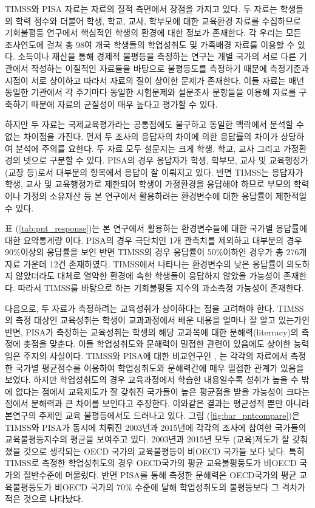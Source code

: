 TIMSS와 PISA 자료는 자료의 질적 측면에서 장점을 가지고 있다.
두 자료는 학생들의 학력 점수와 더불어  학생, 학교, 교사, 학부모에 대한 교육환경 자료를 수집하므로 기회불평등 연구에서 핵심적인 학생의 환경에 대한 정보가 존재한다.
각 우리는 모든 조사연도에 걸쳐 총 98여 개국 학생들의 학업성취도 및 가족배경 자료를 이용할 수 있다.
소득이나 재산을 통해 경제적 불평등을 측정하는 연구는 개별 국가의 서로 다른 기관에서 작성하는 이질적인 자료들을 바탕으로 불평등도를 측정하기 때문에 측정기준과 시점이 서로 상이하고 따라서 자료의 질이 상이한 문제가 존재한다.
이들 자료는 매년 동일한 기관에서 각 주기마다 동일한 시험문제와 설문조사 문항들을 이용해 자료를 구축하기 때문에 자료의 균질성이 매우 높다고 평가할 수 있다.

하지만 두 자료는 국제교육평가라는 공통점에도 불구하고 동일한 맥락에서 분석할 수 없는 차이점을 가진다.
먼저 두 조사의 응답자의 차이에 의한 응답률의 차이가 상당하여 분석에 주의를 요한다. 두 자료 모두 설문지는 크게 학생, 학교, 교사 그리고 가정환경의 넷으로 구분할 수 있다. PISA의 경우 응답자가 학생, 학부모, 교사 및 교육행정가(교장 등)로서 대부분의 항목에서 응답이 잘 이뤄지고 있다. 반면 TIMSS는 응답자가 학생, 교사 및 교육행정가로 제한되어 학생이 가정환경을 응답해야 하므로 부모의 학력이나 가정의 소유재산 등 본 연구에서 활용하려는 환경변수에 대한 응답률이 제한적일 수 있다.



표 (\ref{tab:pnt_response})는 본 연구에서 활용하는 환경변수들에 대한 국가별 응답률에 대한 요약통계량 이다. PISA의 경우 극단치인 1개 관측치를 제외하고 대부분의 경우 90\%이상의 응답률을 보인 반면 TIMSS의 경우 응답률이 50\%이하인 경우가 총 276개 자료 가운데 12건 존재하였다. 
TIMSS에서 나타나는 환경변수의 낮은 응답률이 의도하지 않았더라도 대체로 열악한 환경에 속한 학생들이 응답하지 않았을 가능성이 존재한다.
따라서 TIMSS를 바탕으로 하는 기회불평등 지수의 과소측정 가능성이 존재한다.

다음으로, 두 자료가 측정하려는 교육성취가 상이하다는 점을 고려해야 한다.
TIMSS의 측정 대상인 교육성취는 학생이 교과과정에서 배운 내용을 얼마나 잘 알고 있는가인 반면, PISA가 측정하는 교육성취는 학생의 해당 교과목에 대한 문해력(literracy)의 측정에 촛점을 맞춘다.
이들 학업성취도와 문해력이 밀접한 관련이 있음에도 상이한 능력임은 주지의 사실이다.
TIMSS와 PISA에 대한 비교연구인 \citet{wu09}, \citet{Klieme16}는 각각의 자료에서 측정한 국가별 평균점수를 이용하여 학업성취도와 문해력간에 매우 밀접한 관계가 있음을 보였다.
하지만 학업성취도의 경우 교육과정에서 학습한 내용일수록 성취가 높을 수 밖에 없다는 점에서 교육제도가 잘 갖춰진 국가들이 높은 평균점을 받을 가능성이 크다는 점에서 문해력과 큰 차이를 보인다고 주장한다. 
이와같은 결과는 평균성적 뿐만 아니라 본연구의 주제인 교육 불평등에서도 드러나고 있다.
그림 (\ref{fig:bar_pntcompare})은 TIMSS와 PISA가 동시에 치뤄진 2003년과 2015년에 각각의 조사에 참여한 국가들의 교육불평등지수의 평균을 보여주고 있다.
2003년과 2015년 모두 (교육)제도가 잘 갖춰졌을 것으로 생각되는 OECD 국가의 교육불평등이 비OECD 국가들 보다 낮다.
특히 TIMSS로 측정한 학업성취도의 경우 OECD국가의 평균 교육불평등도가 비OECD 국가의 절반수준에 머물렀다.
반면 PISA를 통해 측정한 문해력은 OECD국가의 평균 교육불평등도가 비OECD 국가의 70\% 수준에 달해 학업성취도의 불평등보다 그 격차가 적은 것으로 나타났다.

